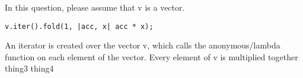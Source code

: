 %
%
In this question, please assume that v is a vector.
\begin{lstlisting}
v.iter().fold(1, |acc, x| acc * x);
\end{lstlisting}
  \choice An iterator is created over the vector v, which calls the anonymous/lambda function on each element of the vector.
  \choice Every element of v is multiplied together
  \choice thing3
  \choice thing4
